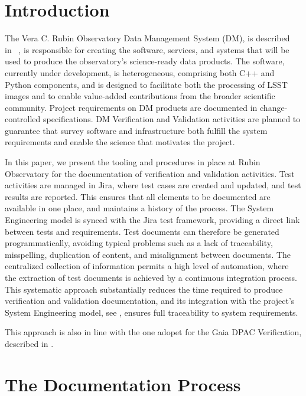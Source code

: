 \section{Introduction}

The Vera C. Rubin Observatory Data Management System (DM), is described in~\cite{2015arXiv151207914J} ,
is responsible for creating the software, services, and systems that will be used to
produce the observatory's science-ready data products. The software, currently under development, is heterogeneous,
comprising both C++ and Python components, and is designed to facilitate both the processing of LSST images
and to enable value-added contributions from the broader scientific community. Project requirements on DM
products are documented in change-controlled specifications. DM Verification and Validation activities are planned
to guarantee that survey software and infrastructure both fulfill the system requirements and enable the science that
motivates the project.

In this paper, we present the tooling and procedures in place at Rubin Observatory for the documentation of verification and
validation activities. Test activities are managed in Jira, where test cases are created and updated, and test results
are reported. This ensures that all elements to be documented are available in one place, and maintains a history of
the process. The System Engineering model is synced with the Jira test framework, providing a direct link between
tests and requirements. Test documents can therefore be generated programmatically, avoiding typical problems
such as a lack of traceability, misspelling, duplication of content, and misalignment between documents. The
centralized collection of information permits a high level of automation, where the extraction of test documents is
achieved by a continuous integration process. This systematic approach substantially reduces the time required to
produce verification and validation documentation, and its integration with the project's System Engineering model, 
see \cite{10.1117/12.2310125}, ensures full traceability to system requirements.

This approach is also in line with the one adopet for the Gaia DPAC Verification, described in \cite{10.1117/12.926797}.


\section{The Documentation Process}

